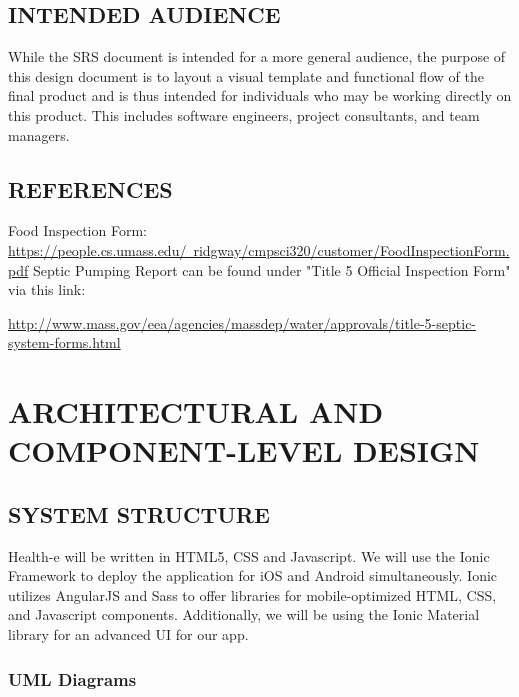\documentclass[twoside,letterpaper]{article}
\begin{document}
\subsection[INTENDED AUDIENCE]{\rmfamily\bfseries\color{black}
INTENDED AUDIENCE}
{\rmfamily\color{black}
While the SRS document is intended for a more general audience, the purpose of this design document is to layout a visual template and functional flow of the final product and is thus intended for individuals who may be working directly on this product. This includes software engineers, project consultants, and team managers. 
}

\subsection[REFERENCES]{\rmfamily\bfseries\color{black}
REFERENCES}
{\rmfamily\color{black}
Food Inspection Form: 
\hyperref[]{https://people.cs.umass.edu/~ridgway/cmpsci320/customer/FoodInspectionForm.pdf}
\newline
Septic Pumping Report can be found under "Title 5 Official Inspection Form" via this link: 
\newline

\hyperref[]{http://www.mass.gov/eea/agencies/massdep/water/approvals/title-5-septic-system-forms.html}
}

\clearpage\section[ARCHITECTURAL AND COMPONENT-LEVEL DESIGN]{\rmfamily\bfseries\color{black}
ARCHITECTURAL AND COMPONENT-LEVEL DESIGN}
\subsection[SYSTEM STRUCTURE]{\rmfamily\bfseries\color{black}
SYSTEM STRUCTURE}
Health-e will be written in HTML5, CSS and Javascript. We will use the Ionic Framework to deploy the application for iOS and Android simultaneously. Ionic utilizes AngularJS and Sass to offer libraries for mobile-optimized HTML, CSS, and Javascript components. Additionally, we will be using the Ionic Material library for an advanced UI for our app. 
\subsubsection{UML Diagrams}
\end{document}

